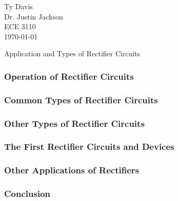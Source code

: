 \documentclass[12pt]{article}
\begin{document}
\begin{flushleft}

Ty Davis\\
Dr. Justin Jackson\\
ECE 3110\\
\today \\


\begin{center}
  Application and Types of Rectifier Circuits
\end{center}



\setlength{\parindent}{0.5in}



\subsubsection*{Operation of Rectifier Circuits}


\subsubsection*{Common Types of Rectifier Circuits}


\subsubsection*{Other Types of Rectifier Circuits}


\subsubsection*{The First Rectifier Circuits and Devices}


\subsubsection*{Other Applications of Rectifiers}


\subsubsection*{Conclusion}



\newpage
\nocite{*}

\printbibliography

\end{flushleft}
\end{document}
